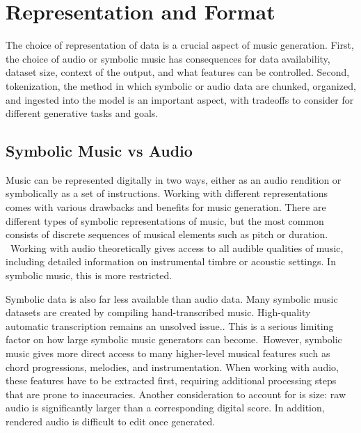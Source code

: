 \section{Representation and Format}\label{section:representation}
The choice of representation of data is a crucial aspect of music generation. First, the choice of audio or symbolic music has consequences for data availability, dataset size, context of the output, and what features can be controlled. Second, tokenization, the method in which symbolic or audio data are chunked, organized, and ingested into the model is an important aspect, with tradeoffs to consider for different generative tasks and goals. 


\subsection{Symbolic Music vs Audio}\label{section:symbolic_audio}
Music can be represented digitally in two ways, either as an audio rendition or symbolically as a set of instructions. Working with different representations comes with various drawbacks and benefits for music generation. There are different types of symbolic representations of music, but the most common consists of discrete sequences of musical elements such as pitch or duration.  Working with audio theoretically gives access to all audible qualities of music, including detailed information on instrumental timbre or acoustic settings. In symbolic music, this is more restricted. 

Symbolic data is also far less available than audio data. Many symbolic music datasets are created by compiling hand-transcribed music. High-quality automatic transcription remains an unsolved issue.\cite{Ji_Yang_Luo_survey_symbolic_2024}\cite{Chen_Smith_Spijkervet_Wang_Zou_Li_Kong_Du_2024}. This is a serious limiting factor on how large symbolic music generators can become. However, symbolic music gives more direct access to many higher-level musical features such as chord progressions, melodies, and instrumentation. When working with audio, these features have to be extracted first, requiring additional processing steps that are prone to inaccuracies. 
Another consideration to account for is size: raw audio is significantly larger than a corresponding digital score. In addition, rendered audio is difficult to edit once generated. 
 
